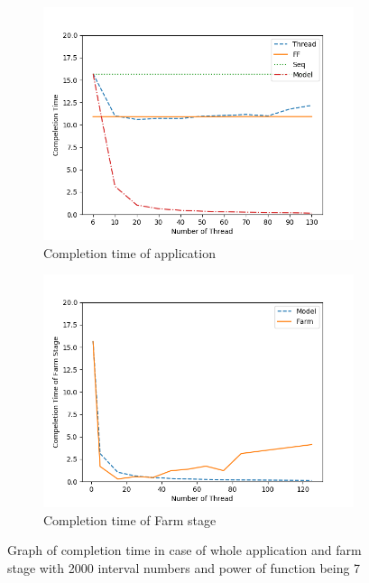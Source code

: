 \documentclass[runningheads,a4paper]{llncs}
\begin{document}
\begin{figure}[t!]
	\centering
	\begin{subfigure}[b]{0.4\textwidth}
		\includegraphics[scale = 0.4]{image/graph/pow07_2000_0_130_perfect}
		\caption{Completion time of application}
		\label{Fig:a}
	\end{subfigure}
	\begin{subfigure}[b]{0.4\textwidth}
		\includegraphics[scale = 0.4]{image/graph/Farm_pow07_2000_0_130_perfect}
		\caption{Completion time of Farm stage}
		\label{Fig:b}
	\end{subfigure}
	\caption{Graph of completion time in case of whole application and farm stage with 2000 interval numbers and power of function being 7}
	\label{Fig:2000_130}
\end{figure}
\end{document}
